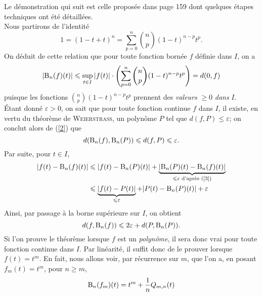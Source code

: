 \begin{preuve}
    Le démonstration qui suit est celle proposée dans \cite{calcul_infinitesimal} page 159 dont quelques étapes techniques ont été détaillées. \\
    Nous partirons de l'identité
    \begin{equation}
        1 = (1-t+t)^n = \sum_{p=0}^n \binom{n}{p} (1-t)^{n-p}t^p.
    \end{equation}
    On déduit de cette relation que pour toute fonction bornée $f$ définie dans $I$, on a
    \begin{equation} \label{2}
        |\mathrm{B}_n(f)(t)| \leqslant \sup_{t \in I} |f(t)| \cdot \left(\sum_{p=0}^n \binom{n}{p} (1-t)^{n-p}t^p \right) = d(0, f)
    \end{equation}
    puisque les fonctions $\binom{n}{p}(1-t)^{n-p}t^p$ prennent des \emph{valeurs} $\geqslant 0$ \emph{dans} $I$. \\
    Étant donné $\varepsilon > 0$, on sait que pour toute fonction continue $f$ dans $I$, il existe, en vertu du théorème de \textsc{Weierstrass}, un polynôme $P$ tel que $d(f, P) \leqslant \varepsilon$; on conclut alors de (\ref{2}) que
    \begin{equation} \label{3}
        d(\mathrm{B}_n(f), \mathrm{B}_n(P)) \leqslant d(f, P) \leqslant \varepsilon.
    \end{equation}
    Par suite, pour $t \in I$,
    \begin{align*}
        |f(t)-\mathrm{B}_n(f)(t)| &\leqslant |f(t) - \mathrm{B}_n(P)(t)| + \underbrace{|\mathrm{B}_n(P)(t) - \mathrm{B}_n(f)(t)|}_{\leqslant \varepsilon \text{ d'après (\ref{3})}} \\
        &\leqslant \underbrace{|f(t) - P(t)|}_{\leqslant \varepsilon} + |P(t) - \mathrm{B}_n(P)(t)| + \varepsilon
    \end{align*}
    Ainsi, par passage à la borne supérieure sur $I$, on obtient
    \begin{equation} \label{5}
        d(f, \mathrm{B}_n(f)) \leqslant 2 \varepsilon + d(P, \mathrm{B}_n(P)).
    \end{equation}
    Si l'on prouve le théorème lorsque $f$ est un \emph{polynôme}, il sera donc vrai pour toute fonction continue dans $I$. Par linéarité, il suffit donc de le prouver lorsque $f(t) = t^m$. En fait, nous allons voir, par récurrence sur $m$, que l'on a, en posant $f_m(t) = t^m$, pour $n \geqslant m$, 
    \begin{equation} \label{6}
        \Bernstein_n(f_m)(t) = t^m + \frac{1}{n}Q_{m,n}(t)

\end{equation}
\end{preuve}
